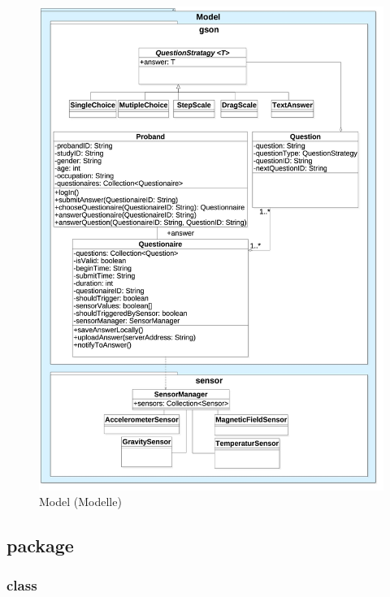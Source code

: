 \documentclass[a4paper]{scrreprt}
\begin{document}
            \begin{figure}[H]
                \centering
                \includegraphics[scale=0.28]{Model.jpg}
                \caption{Model (Modelle)}
            \end{figure}


            \newpage
            \subsection{package }

                \vspace*{1cm}
                \subsubsection{class }
\end{document}
